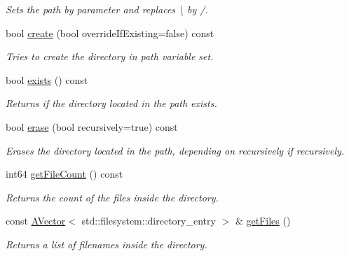 \begin{DoxyCompactItemize}
\begin{DoxyCompactList}\small\item\em Sets the path by parameter and replaces \textbackslash{} by /. \end{DoxyCompactList}\item 
bool \mbox{\hyperlink{class_dir_a58485e06d15995822a108246d2b76b47}{create}} (bool override\+If\+Existing=false) const
\begin{DoxyCompactList}\small\item\em Tries to create the directory in path variable set. \end{DoxyCompactList}\item 
bool \mbox{\hyperlink{class_dir_ac6bf80b5b3a034e8c144c86ef48ae309}{exists}} () const
\begin{DoxyCompactList}\small\item\em Returns if the directory located in the path exists. \end{DoxyCompactList}\item 
bool \mbox{\hyperlink{class_dir_ac07ff8b32d21e0dbdfdedf4116b927eb}{erase}} (bool recursively=true) const
\begin{DoxyCompactList}\small\item\em Erases the directory located in the path, depending on recursively if recursively. \end{DoxyCompactList}\item 
int64 \mbox{\hyperlink{class_dir_ae69556b4b4495ac7fe5854d1f025488e}{get\+File\+Count}} () const
\begin{DoxyCompactList}\small\item\em Returns the count of the files inside the directory. \end{DoxyCompactList}\item 
const \mbox{\hyperlink{class_a_vector}{A\+Vector}}$<$ std\+::filesystem\+::directory\+\_\+entry $>$ \& \mbox{\hyperlink{class_dir_ae573871f2f0ff5ec00ff20e7dc2ab709}{get\+Files}} ()
\begin{DoxyCompactList}\small\item\em Returns a list of filenames inside the directory. \end{DoxyCompactList}\end{DoxyCompactItemize}
